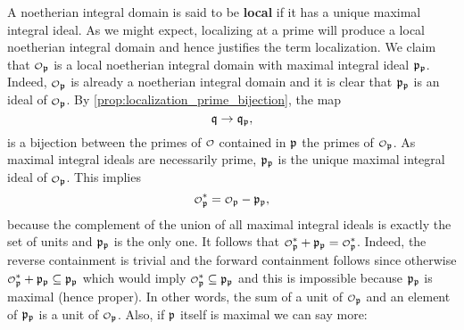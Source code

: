     A noetherian integral domain is said to be \textbf{local} if it has a unique maximal integral ideal. As we might expect, localizing at a prime will produce a local noetherian integral domain and hence justifies the term localization. We claim that $\smc{O}_{\mf{p}}$ is a local noetherian integral domain with maximal integral ideal $\mathfrak{p}_{\mathfrak{p}}$. Indeed, $\smc{O}_{\mf{p}}$ is already a noetherian integral domain and it is clear that $\mathfrak{p}_{\mathfrak{p}}$ is an ideal of $\smc{O}_{\mf{p}}$. By \cref{prop:localization_prime_bijection}, the map
    \[
      \mathfrak{q} \to \mathfrak{q}_{\mathfrak{p}},
    \]
    is a bijection between the primes of $\smc{O}$ contained in $\mathfrak{p}$ the primes of $\smc{O}_{\mf{p}}$. As maximal integral ideals are necessarily prime, $\mathfrak{p}_{\mathfrak{p}}$ is the unique maximal integral ideal of $\smc{O}_{\mf{p}}$. This implies
    \[
      \smc{O}_{\mf{p}}^{\ast} = \smc{O}_{\mf{p}}-\mf{p}_{\mf{p}},
    \]
    because the complement of the union of all maximal integral ideals is exactly the set of units and $\mathfrak{p}_{\mathfrak{p}}$ is the only one. It follows that $\smc{O}_{\mf{p}}^{\ast}+\mf{p}_{\mf{p}} = \smc{O}_{\mf{p}}^{\ast}$. Indeed, the reverse containment is trivial and the forward containment follows since otherwise $\smc{O}_{\mf{p}}^{\ast}+\mf{p}_{\mf{p}} \subseteq \mf{p}_{\mf{p}}$ which would imply $\smc{O}_{\mf{p}}^{\ast} \subseteq \mf{p}_{\mf{p}}$ and this is impossible because $\mathfrak{p}_{\mathfrak{p}}$ is maximal (hence proper). In other words, the sum of a unit of $\smc{O}_{\mf{p}}$ and an element of $\mathfrak{p}_{\mathfrak{p}}$ is a unit of $\smc{O}_{\mf{p}}$. Also, if $\mathfrak{p}$ itself is maximal we can say more:

